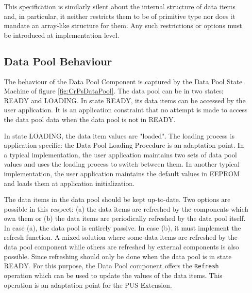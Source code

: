 \documentclass{pnp_article}
\begin{document}
This specification is similarly silent about the internal structure of data items and, in particular, it neither restricts them to be of primitive type nor does it mandate an array-like structure for them. Any such restrictions or options must be introduced at implementation level.

\subsection{Data Pool Behaviour}\label{sec:dpBehaviour}
The behaviour of the Data Pool Component is captured by the Data Pool State Machine of figure \ref{fig:CrPsDataPool}. The data pool can be in two states: READY and LOADING. In state READY, its data items can be accessed by the user application. It is an application constraint that no attempt is made to access the data pool data when the data pool is not in READY.

In state LOADING, the data item values are "loaded". The loading process is application-specific: the Data Pool Loading Procedure is an adaptation point. In a typical implementation, the user application maintains two sets of data pool values and uses the loading process to switch between them. In another typical implementation, the user application maintains the default values in EEPROM and loads them at application initialization.


The data items in the data pool should be kept up-to-date. Two options are possible in this respect: (a) the data items are refreshed by the components which own them or (b) the data items are periodically refreshed by the data pool itself. In case (a), the data pool is entirely passive. In case (b), it must implement the refresh function. A mixed solution where some data items are refreshed by the data pool component while others are refreshed by external components is also possible. Since refreshing should only be done when the data pool is in state READY. For this purpose, the Data Pool component offers the \texttt{Refresh} operation which can be used to update the values of the data items. This operation is an adaptation point for the PUS Extension. 

\end{document}

